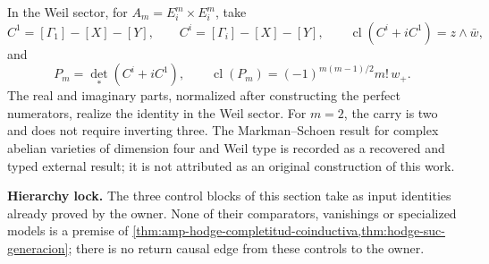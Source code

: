 In the Weil sector, for
\(A_m=E_i^m\times E_i^m\), take
\begin{equation}\label{eq:hodge-suc-weil-graficas}
 C^1=[\Gamma_1]-[X]-[Y],
 \qquad
 C^i=[\Gamma_i]-[X]-[Y],
 \qquad
 \operatorname{cl}(C^i+iC^1)=z\wedge\bar w,
\end{equation}
and
\begin{equation}\label{eq:hodge-suc-weil-determinante}
 P_m=\det_*(C^i+iC^1),
 \qquad
 \operatorname{cl}(P_m)
 =(-1)^{m(m-1)/2}m!\,w_+.
\end{equation}
The real and imaginary parts, normalized after constructing the
perfect numerators, realize the identity in the Weil sector. For
\(m=2\), the carry is two and does not require inverting three. The
Markman--Schoen result for complex abelian varieties of dimension four and
Weil type is recorded
as a recovered and typed external result; it is not attributed as an
original construction of this work.

\noindent\textbf{Hierarchy lock.}
The three control blocks of this section take as input identities
already proved by the owner. None of their comparators, vanishings or
specialized models is a premise of
\cref{thm:amp-hodge-completitud-coinductiva,thm:hodge-suc-generacion}; there is
no return causal edge from these controls to the owner.
